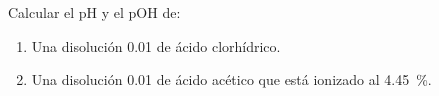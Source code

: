 Calcular el pH y el pOH de:
\begin{enumerate}[label={\alph*)},font={\color{red!50!black}\bfseries}]
	\item Una disolución \SI{0,01}{\Molar} de ácido clorhídrico.
	\item Una disolución \SI{0,01}{\Molar} de ácido acético que está ionizado al \SI{4,45}{\percent}.
\end{enumerate}

